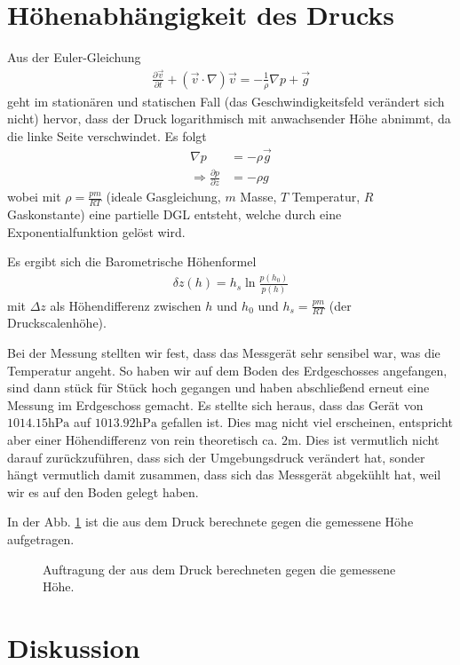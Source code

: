 \documentclass[12pt,a4paper,titlepage,headinclude,bibtotoc]{scrartcl}
\begin{document}
\section{Höhenabhängigkeit des Drucks}
Aus der Euler-Gleichung
\begin{align*}
	\frac{\partial\vec v}{\partial t}+(\vec v\cdot\nabla)\vec v = -\frac{1}{\rho}\nabla p+\vec g
\end{align*}
geht im stationären und statischen Fall (das Geschwindigkeitsfeld verändert sich nicht) hervor, dass der Druck logarithmisch mit anwachsender Höhe abnimmt, da die linke Seite verschwindet.
Es folgt
\begin{align*}
	\nabla p&=-\rho\vec g\\
	\Rightarrow \frac{\partial p}{\partial z}&=-\rho g
\end{align*}
wobei mit $\rho=\frac{pm}{RT}$ (ideale Gasgleichung, $m$ Masse, $T$ Temperatur, $R$ Gaskonstante) eine partielle DGL entsteht, welche durch eine Exponentialfunktion gelöst wird.

Es ergibt sich die Barometrische Höhenformel
\begin{align}
	\delta z(h)=h_s\ln\frac{p(h_0)}{p(h)}
\end{align}
mit $\Delta z$ als Höhendifferenz zwischen $h$ und $h_0$ und $h_s=\frac{pm}{RT}$ (der Druckscalenhöhe).

Bei der Messung stellten wir fest, dass das Messgerät sehr sensibel war, was die Temperatur angeht.
So haben wir auf dem Boden des Erdgeschosses angefangen, sind dann stück für Stück hoch gegangen und haben abschließend erneut eine Messung im Erdgeschoss gemacht.
Es stellte sich heraus, dass das Gerät von $1014.15\si{\hecto\pascal}$ auf $1013.92\si{\hecto\pascal}$ gefallen ist.
Dies mag nicht viel erscheinen, entspricht aber einer Höhendifferenz von rein theoretisch ca. $2\si\meter$.
Dies ist vermutlich nicht darauf zurückzuführen, dass sich der Umgebungsdruck verändert hat, sonder hängt vermutlich damit zusammen, dass sich das Messgerät abgekühlt hat, weil wir es auf den Boden gelegt haben.

In der Abb. \ref{fig:hoehe} ist die aus dem Druck berechnete gegen die gemessene Höhe aufgetragen.

\begin{figure}[h]
	\centering
	
	\caption{Auftragung der aus dem Druck berechneten gegen die gemessene Höhe.}
	\label{fig:hoehe}
\end{figure}





\section{Diskussion}
\label{sec:diskussion}



\end{document}
